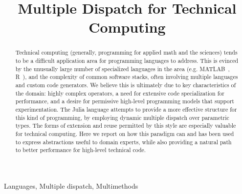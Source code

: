 \documentclass[pldi]{sigplanconf-pldi15}
\begin{document}
\lstset{basicstyle=\footnotesize\ttfamily,mathescape=true,basewidth=0.5em}



\title{Multiple Dispatch for Technical Computing}


\maketitle

\begin{abstract}
  Technical computing (generally, programming for applied math and the sciences) tends
  to be a difficult application area for programming languages to address. This is
  evinced by the unusually large number of specialized languages in the area
  (e.g. MATLAB~\cite{matlab}, R~\cite{rlang}), and the complexity of common
  software stacks, often involving multiple languages and custom code generators.
  We believe this is ultimately due to key characteristics of the domain:
  highly complex operators, a need for extensive code specialization for
  performance, and a desire for permissive high-level programming models that
  support experimentation.
  The Julia language attempts to provide a more effective structure
  for this kind of programming, by employing dynamic multiple dispatch over
  parametric types. The forms of extension and reuse
  permitted by this style are especially valuable for technical computing.
  Here we report on how this paradigm can and has been used to
  express abstractions useful to domain experts, while also providing
  a natural path to better performance for high-level technical code.
\end{abstract}


\terms Languages, Multiple dispatch, Multimethods
\end{document}
